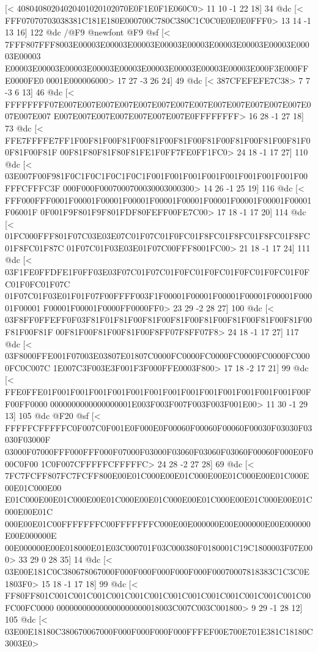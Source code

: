 [<
40804080204020401020102070E0F1E0F1E060C0>
	 11 10 -1 22 18] 34 @dc
[<
FFF07070703038381C181E180E000700C780C380C1C0C0E0E0E0FFF0>
	 13 14 -1 13 16] 122 @dc
/@F9 @newfont
@F9 @sf
[<
7FFF807FFF8003E00003E00003E00003E00003E00003E00003E00003E00003E00003E00003
E00003E00003E00003E00003E00003E00003E00003E00003E00003E000F3E000FFE0000FE0
0001E000006000>
	 17 27 -3 26 24] 49 @dc
[<
387CFEFEFE7C38>
	 7 7 -3 6 13] 46 @dc
[<
FFFFFFFF07E007E007E007E007E007E007E007E007E007E007E007E007E007E007E007E007
E007E007E007E007E007E007E007E0FFFFFFFF>
	 16 28 -1 27 18] 73 @dc
[<
FFE7FFFFE7FF1F00F81F00F81F00F81F00F81F00F81F00F81F00F81F00F81F00F81F00F81F
00F81F80F81F80F81FE1F0FF7FE0FF1FC0>
	 24 18 -1 17 27] 110 @dc
[<
03E007F00F981F0C1F0C1F0C1F0C1F001F001F001F001F001F001F001F001F00FFFCFFFC3F
000F000F0007000700030003000300>
	 14 26 -1 25 19] 116 @dc
[<
FFF000FFF0001F00001F00001F00001F00001F00001F00001F00001F00001F00001F06001F
0F001F9F801F9F801FDF80FEFF00FE7C00>
	 17 18 -1 17 20] 114 @dc
[<
01FC000FFF801F07C03E03E07C01F07C01F0FC01F8FC01F8FC01F8FC01F8FC01F8FC01F87C
01F07C01F03E03E01F07C00FFF8001FC00>
	 21 18 -1 17 24] 111 @dc
[<
03F1FE0FFDFE1F0FF03E03F07C01F07C01F0FC01F0FC01F0FC01F0FC01F0FC01F0FC01F07C
01F07C01F03E01F01F07F00FFFF003F1F00001F00001F00001F00001F00001F00001F00001
F00001F00001F0000FF0000FF0>
	 23 29 -2 28 27] 100 @dc
[<
03F8FF0FFEFF0F03F81F01F81F00F81F00F81F00F81F00F81F00F81F00F81F00F81F00F81F
00F81F00F81F00F81F00F8FF07F8FF07F8>
	 24 18 -1 17 27] 117 @dc
[<
03F8000FFE001F07003E03807E01807C0000FC0000FC0000FC0000FC0000FC0000FC0C007C
1E007C3F003E3F001F3F000FFE0003F800>
	 17 18 -2 17 21] 99 @dc
[<
FFE0FFE01F001F001F001F001F001F001F001F001F001F001F001F001F001F00FF00FF0000
0000000000000000001E003F003F007F003F003F001E00>
	 11 30 -1 29 13] 105 @dc
@F20 @sf
[<
FFFFFCFFFFFC0F007C0F001E0F000E0F00060F00060F00060F00030F03030F03030F03000F
03000F07000FFF000FFF000F07000F03000F03060F03060F03060F00060F000E0F000C0F00
1C0F007CFFFFFCFFFFFC>
	 24 28 -2 27 28] 69 @dc
[<
7FC7FCFF807FC7FCFF800E00E01C000E00E01C000E00E01C000E00E01C000E00E01C000E00
E01C000E00E01C000E00E01C000E00E01C000E00E01C000E00E01C000E00E01C000E00E01C
000E00E01C00FFFFFFFC00FFFFFFFC000E00E000000E00E000000E00E000000E00E000000E
00E000000E00E018000E01E03C000701F03C000380F0180001C19C1800003F07E000>
	 33 29 0 28 35] 14 @dc
[<
03E00E181C0C380678067000F000F000F000F000F000F00070007818383C1C3C0E1803F0>
	 15 18 -1 17 18] 99 @dc
[<
FF80FF801C001C001C001C001C001C001C001C001C001C001C001C001C001C00FC00FC0000
000000000000000000000018003C007C003C001800>
	 9 29 -1 28 12] 105 @dc
[<
03E00E18180C380670067000F000F000F000F000FFFEF00E700E701E381C18180C3003E0>
